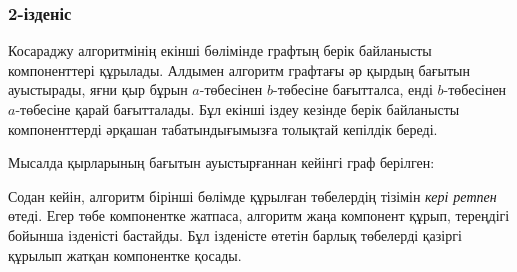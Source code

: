 \subsubsection{2-ізденіс}

Косараджу алгоритмінің екінші бөлімінде графтың берік байланысты
компоненттері құрылады.
Алдымен алгоритм графтағы әр қырдың бағытын ауыстырады, яғни қыр бұрын
$a$-төбесінен $b$-төбесіне бағытталса, енді $b$-төбесінен $a$-төбесіне қарай 
бағытталады. 
Бұл екінші іздеу кезінде  
берік байланысты компоненттерді әрқашан 
табатындығымызға толықтай кепілдік береді.

Мысалда қырларының бағытын ауыстырғаннан кейінгі
граф берілген:
\begin{center}
\end{center}

Содан кейін, алгоритм бірінші бөлімде құрылған төбелердің тізімін
\emph{кері ретпен} өтеді.
Егер төбе компонентке жатпаса, алгоритм жаңа компонент құрып, тереңдігі бойынша ізденісті бастайды. Бұл ізденісте өтетін барлық төбелерді қазіргі құрылып жатқан компонентке қосады.

